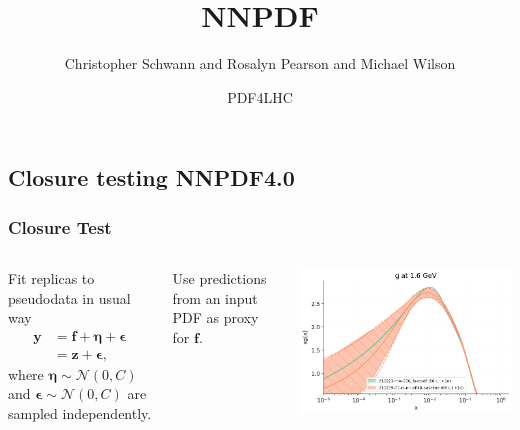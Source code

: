 \newcommand{\shift}{\eta}
\newcommand{\vv}[1]{\boldsymbol{#1}}
\newcommand{\erep}{\mathbf{E}_{\epsilon}}
\newcommand{\eshift}{\mathbf{E}_{\shift}}
\newcommand{\ndata}{N_{\rm data}}
\newcommand\Fontvi{\fontsize{8}{7.2}\selectfont}

\makeatletter
\newcommand{\leqnomode}{\tagsleft@true\let\veqno\@@leqno}
\newcommand{\reqnomode}{\tagsleft@false\let\veqno\@@eqno}
\makeatother

\title{NNPDF}
\author[Michael Wilson]{Christopher Schwann and Rosalyn Pearson and Michael Wilson}
\date{PDF4LHC}

\subsection{Closure testing NNPDF4.0}
\begin{frame}
    \frametitle{Closure Test}
    \Fontvi
    \begin{columns}[t]
    Fit replicas to pseudodata in usual way
    \leqnomode
    \begin{equation}\label{eq:dataassum}
    \begin{split}
        \vv{y} &= \vv{f} + \vv{\shift} + \vv{\epsilon} \\
        &= \vv{z} + \vv{\epsilon},
    \end{split}
    \end{equation}
    where $\vv{\shift} \sim \mathcal{N}(0, C)$ and $\vv{\epsilon} \sim \mathcal{N}(0, C)$ are sampled independently.
    
    Use predictions from an input PDF as proxy for $\vv{f}$.

    \includegraphics[scale=0.3]{closure_test/plot_pdfs_g.png}
    

\end{columns}
\end{frame}
